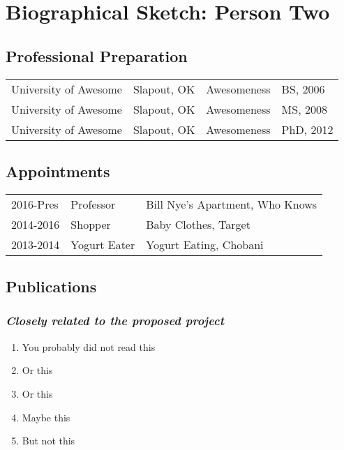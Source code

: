 

\setcounter{subsection}{0}
\renewcommand\thesubsection{(\alph{subsection})}
\renewcommand\thesubsubsection{\textit{(\roman{subsubsection})}}

\section*{Biographical Sketch: Person Two}

\subsection{Professional Preparation}
\begin{tabular}[c]{llll}
University of Awesome & Slapout, OK & Awesomeness & BS, 2006\\
University of Awesome & Slapout, OK & Awesomeness & MS, 2008\\
University of Awesome & Slapout, OK & Awesomeness & PhD, 2012\\
\end{tabular}

\subsection{Appointments}
\begin{tabularx}{\textwidth}{ l l Y }
2016-Pres & Professor & Bill Nye's Apartment, Who Knows \\
2014-2016 & Shopper & Baby Clothes, Target \\
2013-2014 & Yogurt Eater & Yogurt Eating, Chobani \\
\end{tabularx}

\subsection{Publications}
\subsubsection{\textit{Closely related to the proposed project}}
\begin{enumerate}
\item You probably did not read this
\item Or this
\item Or this
\item Maybe this
\item But not this
\end{enumerate}
